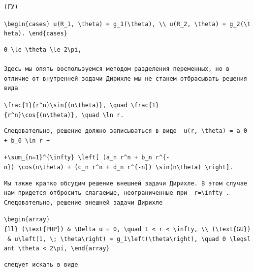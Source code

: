\documentclass[
  ukrainian,
]{article}
\begin{document}
\begin{verbatim}
(ГУ)
\end{verbatim}

\texttt{\textbackslash{}begin\{cases\}\ u(R\_1,\ \textbackslash{}theta)\ =\ g\_1(\textbackslash{}theta),\ \textbackslash{}\textbackslash{}\ u(R\_2,\ \textbackslash{}theta)\ =\ g\_2(\textbackslash{}theta).\ \textbackslash{}end\{cases\}}

\begin{verbatim}
0 \le \theta \le 2\pi, 

Здесь мы опять воспользуемся методом разделения переменных, но в отличие от внутренней зодачи Дирихле мы не станем отбрасывать решения вида
\end{verbatim}

\texttt{\textbackslash{}frac\{1\}\{r\^{}n\}\textbackslash{}sin\{(n\textbackslash{}theta)\},\ \textbackslash{}quad\ \textbackslash{}frac\{1\}\{r\^{}n\}\textbackslash{}cos\{(n\textbackslash{}theta)\},\ \textbackslash{}quad\ \textbackslash{}ln\ r.}

\begin{verbatim}
Следовательно, решение должно записываться в виде  u(r, \theta) = a_0 + b_0 \ln r +
\end{verbatim}

\texttt{+\textbackslash{}sum\_\{n=1\}\^{}\{\textbackslash{}infty\}\ \textbackslash{}left{[}\ (a\_n\ r\^{}n\ +\ b\_n\ r\^{}\{-n\})\ \textbackslash{}cos(n\textbackslash{}theta)\ +\ (c\_n\ r\^{}n\ +\ d\_n\ r\^{}\{-n\})\ \textbackslash{}sin(n\textbackslash{}theta)\ \textbackslash{}right{]}.}

\begin{verbatim}
Мы также кратко обсудим решение внешней задачи Дирихле. В этом случае нам придется отбросить слагаемые, неограниченные при  r=\infty . Следовательно, решение внешней задачи Дирихле
\end{verbatim}

\texttt{\textbackslash{}begin\{array\}\{ll\}\ (\textbackslash{}text\{PHP\})\ \&\ \textbackslash{}Delta\ u\ =\ 0,\ \textbackslash{}quad\ 1\ \textless{}\ r\ \textless{}\ \textbackslash{}infty,\ \textbackslash{}\textbackslash{}\ (\textbackslash{}text\{GU\})\ \&\ u\textbackslash{}left(1,\ \textbackslash{};\ \textbackslash{}theta\textbackslash{}right)\ =\ g\_1\textbackslash{}left(\textbackslash{}theta\textbackslash{}right),\ \textbackslash{}quad\ 0\ \textbackslash{}leqslant\ \textbackslash{}theta\ \textless{}\ 2\textbackslash{}pi,\ \textbackslash{}end\{array\}}

\begin{verbatim}
следует искать в виде
\end{verbatim}
\end{document}
